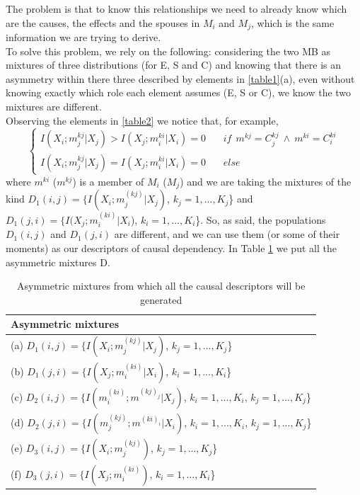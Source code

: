 The problem is that to know this relationships we need to already know which are the causes, the effects and the spouses in $M_i$ and $M_j$, which is the same information we are trying to derive.\\

To solve this problem, we rely on the following: considering the two MB as mixtures of three distributions (for E, S and C) and knowing that there is an asymmetry within there three described by elements in \ref{table1}(a), even without knowing exactly which role each element assumes (E, S or C), we know the two mixtures are different.\\
Observing the elements in \ref{table2} we notice that, for example, $$
\begin{cases}
    I(X_i;m^{kj}_j|X_j) > I(X_j;m^{ki}_i|X_i) = 0  \ \ \ \ \ \ \ \ if \ \ m^{kj} = C^{kj}_j \ \wedge \  m^{ki} = C^{ki}_i \\
    I(X_i;m^{kj}_j|X_j) = I(X_j;m^{ki}_i|X_i) = 0 \ \ \ \ \ \ \ \ else
\end{cases}
$$
where $m^{ki}$ ($m^{kj}$) is a member of $M_i$ ($M_j$) and we are taking the mixtures of the kind $D_1(i,j) = \{I(X_i; m^{(kj)}_j|X_j)$, $k_j = 1, ..., K_j$\} and $D_1(j,i) = \{I(X_j; m^{(ki)}_i|X_i$), $k_i = 1, ..., K_i$\}. So, as said, the populations $D_1(i,j)$ and $D_1(j,i)$ are different, and we can use them (or some of their moments) as our descriptors of causal dependency. In Table \ref{table3} we put all the asymmetric mixtures D.

\begin{table}[!ht]
    \centering
    \begin{tabular}{l}
    \hline
        \textbf{Asymmetric mixtures} \\ \hline
         (a) $D_1(i,j) = \{I(X_i; m^{(kj)}_j|X_j)$, $k_j = 1, ..., K_j$\}\\
         (b) $D_1(j,i) = \{I(X_j; m^{(ki)}_i|X_i)$, $k_i = 1, ..., K_i$\}\\
         (c) $D_2(i,j) = \{I(m^{(ki)}_i; m^{(kj)_j}|X_j)$, $k_i = 1, ..., K_i$, $k_j = 1, ..., K_j$\}\\
         (d) $D_2(j,i) = \{I(m^{(kj)}_j; m^{(ki)_i}|X_i)$, $k_i = 1, ..., K_i$, $k_j = 1, ..., K_j$\}\\
         (e) $D_3(i,j) = \{I(X_i;m^{(kj)}_j)$, $k_j = 1, ..., K_j$\}\\ (f) $D_3(j,i) = \{I(X_j;m^{(ki)}_i)$, $k_i = 1, ..., K_i$\}
         \\ \hline
    \end{tabular}
    \caption{Asymmetric mixtures from which all the causal descriptors will be generated}
    \label{table3}
\end{table}


